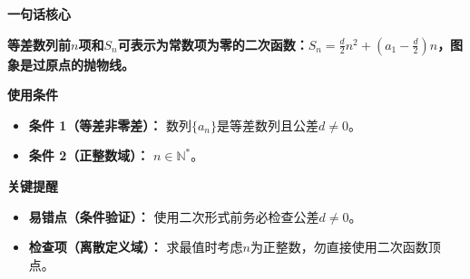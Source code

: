 \begin{summarybox}
	\textbf{\textcolor{CSummary}{一句话核心}}

	\textbf{等差数列前$n$项和$S_n$可表示为常数项为零的二次函数：$S_n = \frac{d}{2}n^2 + \left(a_1 - \frac{d}{2}\right)n$，图象是过原点的抛物线。}

	\medskip
	\textbf{\textcolor{CSummary}{使用条件}}
	\begin{itemize}[leftmargin=*, itemsep=0.5em, topsep=0.4em]
		\item \textbf{条件 1（等差非零差）：} 数列$\{a_n\}$是等差数列且公差$d\neq0$。
		\item \textbf{条件 2（正整数域）：} $n\in\mathbb{N}^*$。
	\end{itemize}

	\medskip
	\textbf{\textcolor{CSummary}{关键提醒}}
	\begin{itemize}[leftmargin=*, itemsep=0.5em, topsep=0.4em]
		\item \textbf{易错点（条件验证）：} 使用二次形式前务必检查公差$d\neq0$。
		\item \textbf{检查项（离散定义域）：} 求最值时考虑$n$为正整数，勿直接使用二次函数顶点。
	\end{itemize}
\end{summarybox}
